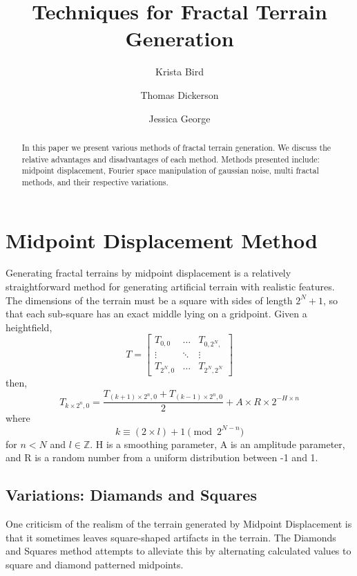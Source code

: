 \documentclass{article}
\title{Techniques for Fractal Terrain Generation}
\author{Krista Bird \and Thomas Dickerson \and Jessica George}
\begin{document}
    \maketitle

     \begin{abstract}
     In this paper we present various methods of fractal terrain generation. We discuss the relative advantages and disadvantages of each method. Methods presented include: midpoint displacement, Fourier space manipulation of gaussian noise, multi fractal methods, and their respective variations. 
     \end{abstract}

	\section{Midpoint Displacement Method}
		Generating fractal terrains by midpoint displacement is a relatively straightforward method for generating artificial terrain with realistic features. The dimensions of the terrain must be a square with sides of length $2^{N}+1$, so that each sub-square has an exact middle lying on a gridpoint. Given a heightfield,
		\begin{equation}
		T = \left[ \begin{matrix}
		T_{0,0} & \ldots & T_{0,2^{N},} \\
		\vdots  &  \ddots & \vdots \\
		T_{2^{N},0} & \ldots & T_{2^{N},2^{N}}
		\end{matrix} \right]
		\end{equation}
then,
		\begin{equation}
			T_{k \times 2^{n},0} = \frac{T_{(k+1) \times 2^{n},0} + T_{(k-1) \times 2^{n},0}}{2} + A \times R \times 2^{-H \times n}
		\end{equation}
where
		\begin{equation}
			k \equiv (2 \times l)+1 \pmod{2^{N-n}}
		\end{equation}
for $n < N$ and $l \in \mathbb{Z}$. H is a smoothing parameter, A is an amplitude parameter, and R is a random number from a uniform distribution between -1 and 1.
	\subsection{Variations: Diamands and Squares}
		One criticism of the realism of the terrain generated by Midpoint Displacement is that it sometimes leaves square-shaped artifacts in the terrain. The Diamonds and Squares method attempts to alleviate this by alternating calculated values to square and diamond patterned midpoints. 
\end{document}
